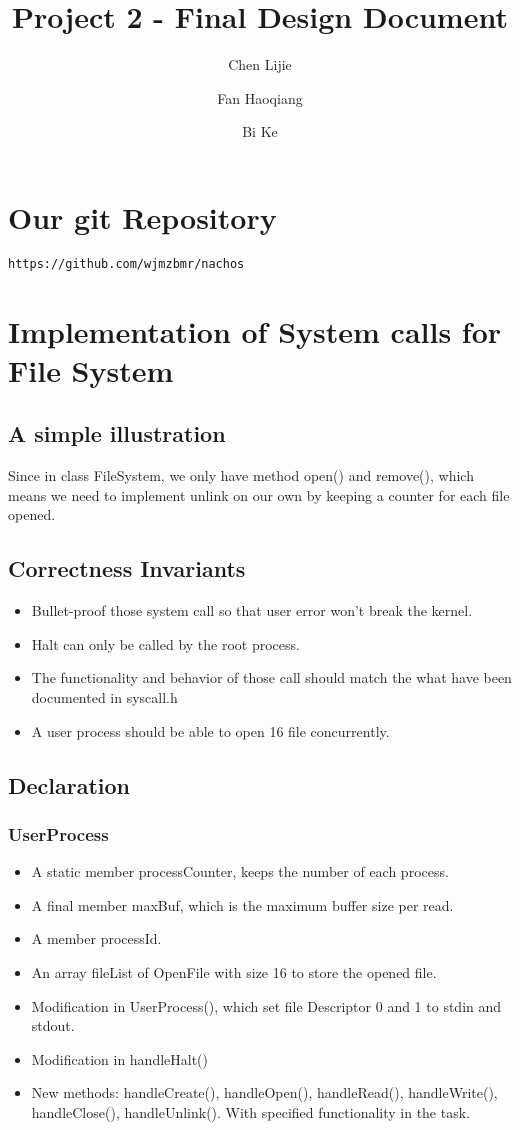\documentclass{article}
\title{Project 2 - Final Design Document}
\author{Chen Lijie\\ \and
	Fan Haoqiang\\ \and
	Bi Ke\\ }
\date{}
\begin{document}
	\maketitle
	\section{Our git Repository}
	\texttt{https://github.com/wjmzbmr/nachos}
	\section{Implementation of System calls for File System}
	\subsection{A simple illustration}
	Since in class FileSystem, we only have method open() and remove(), which means we need to implement unlink on our own by keeping a counter for each file opened.
	\subsection{Correctness Invariants}
	\begin{itemize}
		\item Bullet-proof those system call so that user error won't break the kernel.
		\item Halt can only be called by the root process.
		\item The functionality and behavior of those call should match the what have been documented in syscall.h
		\item A user process should be able to open 16 file concurrently.
	\end{itemize}
	\subsection{Declaration}
	\subsubsection*{UserProcess}
	\begin{itemize}
		\item A static member processCounter, keeps the number of each process.
		\item A final member maxBuf, which is the maximum buffer size per read.
		\item A member processId.
		\item An array fileList of OpenFile with size 16 to store the opened file.
		\item Modification in UserProcess(), which set file Descriptor 0 and 1 to stdin and stdout.
		\item Modification in handleHalt()
		\item New methods: handleCreate(), handleOpen(), handleRead(), handleWrite(), handleClose(), handleUnlink(). With specified functionality in the task.
	\end{itemize}
\end{document}
